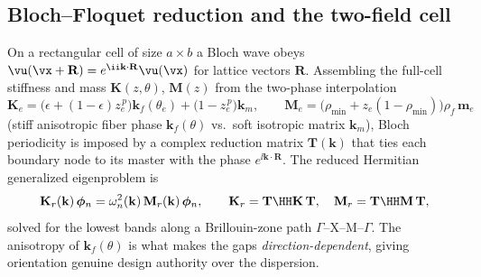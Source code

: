 \documentclass[11pt]{article}
\begin{document}
\subsection{Bloch--Floquet reduction and the two-field cell}
On a rectangular cell of size $a\times b$ a Bloch wave obeys
$\vu(\vx+\mathbf R)=e^{\ii\mathbf k\cdot\mathbf R}\vu(\vx)$ for lattice vectors
$\mathbf R$. Assembling the full-cell stiffness and mass $\mathbf K(z,\theta)$,
$\mathbf M(z)$ from the two-phase interpolation
\begin{equation}
  \mathbf K_e=\bigl(\epsilon+(1-\epsilon)z_e^{\,p}\bigr)\mathbf k_f(\theta_e)
  +\bigl(1-z_e^{\,p}\bigr)\mathbf k_m,\qquad
  \mathbf M_e=\bigl(\rho_{\min}+z_e(1-\rho_{\min})\bigr)\rho_f\,\mathbf m_e
\end{equation}
(stiff anisotropic fiber phase $\mathbf k_f(\theta)$ vs.\ soft isotropic matrix
$\mathbf k_m$), Bloch periodicity is imposed by a complex reduction matrix
$\mathbf T(\mathbf k)$ that ties each boundary node to its master with the phase
$e^{\ii\mathbf k\cdot\mathbf R}$. The reduced Hermitian generalized eigenproblem is
\begin{equation}
  \mathbf K_r(\mathbf k)\,\bm\phi_n=\omega_n^2(\mathbf k)\,\mathbf M_r(\mathbf k)\,
  \bm\phi_n,\qquad
  \mathbf K_r=\mathbf T\HH\mathbf K\,\mathbf T,\quad
  \mathbf M_r=\mathbf T\HH\mathbf M\,\mathbf T,
  \label{eq:bloch}
\end{equation}
solved for the lowest bands along a Brillouin-zone path $\Gamma$--X--M--$\Gamma$.
The anisotropy of $\mathbf k_f(\theta)$ is what makes the gaps
\emph{direction-dependent}, giving orientation genuine design authority over the
dispersion.
\end{document}

